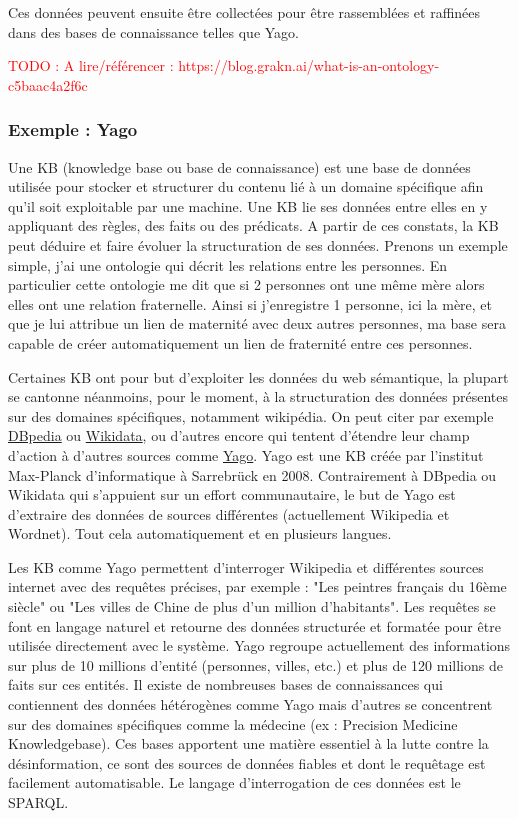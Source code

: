 \documentclass[12pt]{article}
\newcommand\todo[1]{\textcolor{red}{TODO : #1}}
\begin{document}
Ces données peuvent ensuite être collectées pour être rassemblées et raffinées dans des bases de connaissance telles que Yago.

\todo{A lire/référencer : https://blog.grakn.ai/what-is-an-ontology-c5baac4a2f6c}

\subsubsection{Exemple : Yago}

Une KB (knowledge base ou base de connaissance) est une base de données utilisée pour stocker et structurer du contenu lié à un domaine spécifique afin qu'il soit exploitable par une machine. Une KB lie ses données entre elles en y appliquant des règles, des faits ou des prédicats. A partir de ces constats, la KB peut déduire et faire évoluer la structuration de ses données. Prenons un exemple simple, j'ai une ontologie qui décrit les relations entre les personnes. En particulier cette ontologie me dit que si 2 personnes ont une même mère alors elles ont une relation fraternelle. Ainsi si j'enregistre 1 personne, ici la mère, et que je lui attribue un lien de maternité avec deux autres personnes, ma base sera capable de créer automatiquement un lien de fraternité entre ces personnes.

Certaines KB ont pour but d'exploiter les données du web sémantique, la plupart se cantonne néanmoins, pour le moment, à la structuration des données présentes sur des domaines spécifiques, notamment wikipédia. On peut citer par exemple \href{http://wiki.dbpedia.org/about}{DBpedia} ou \href{https://www.wikidata.org/wiki/Wikidata:Main_Page}{Wikidata}, ou d'autres encore qui tentent d'étendre leur champ d'action à d'autres sources comme \href{http://www.mpi-inf.mpg.de/departments/databases-and-information-systems/research/yago-naga/yago/}{Yago}.
\newline{}
Yago est une KB créée par l'institut Max-Planck d'informatique à Sarrebrück en 2008. Contrairement à DBpedia ou Wikidata qui s'appuient sur un effort communautaire, le but de Yago est d'extraire des données de sources différentes (actuellement Wikipedia et Wordnet). Tout cela automatiquement et en plusieurs langues.

Les KB comme Yago permettent d'interroger Wikipedia et différentes sources internet avec des requêtes précises, par exemple : "Les peintres français du 16ème siècle" ou "Les villes de Chine de plus d'un million d'habitants". Les requêtes se font en langage naturel et retourne des données structurée et formatée pour être utilisée directement avec le système. Yago regroupe actuellement des informations sur plus de 10 millions d'entité (personnes, villes, etc.) et plus de 120 millions de faits sur ces entités. 
Il existe de nombreuses bases de connaissances qui contiennent des données hétérogènes comme Yago mais d'autres se concentrent sur des domaines spécifiques comme la médecine (ex : Precision Medicine Knowledgebase). Ces bases apportent une matière essentiel à la lutte contre la désinformation, ce sont des sources de données fiables et dont le requêtage est facilement automatisable.
Le langage d'interrogation de ces données est le SPARQL.
\end{document}
